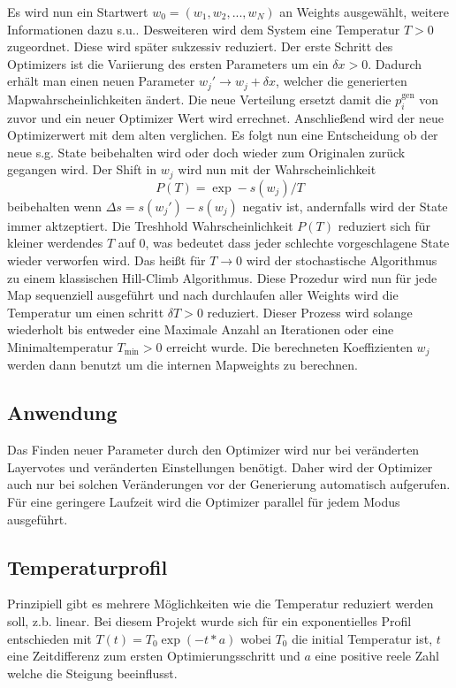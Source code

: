 Es wird nun ein Startwert $w_0=(w_1,w_2,...,w_N)$ an Weights ausgewählt, weitere Informationen dazu s.u.. 
Desweiteren wird dem System eine \glqq Temperatur \grqq $T>0$ zugeordnet. 
Diese wird später sukzessiv reduziert.
Der erste Schritt des Optimizers ist die Variierung des ersten Parameters um ein $\delta x>0$.
Dadurch erhält man einen neuen Parameter $w_j' \rightarrow w_j + \delta x$, welcher die generierten Mapwahrscheinlichkeiten ändert.
Die neue Verteilung ersetzt damit die $p_i^\text{gen}$ von zuvor und ein neuer Optimizer Wert wird errechnet.
Anschließend wird der neue Optimizerwert mit dem alten verglichen.
Es folgt nun eine Entscheidung ob der neue s.g. State beibehalten wird oder doch wieder zum Originalen zurück gegangen wird.
Der Shift in $w_j$ wird nun mit der Wahrscheinlichkeit 
\begin{equation}
    P(T) = \exp -s(w_j)/T 
\end{equation}
beibehalten wenn $\Delta s = s(w_j')-s(w_j)$ negativ ist, andernfalls wird der State immer aktzeptiert. 
Die Treshhold Wahrscheinlichkeit $P(T)$ reduziert sich für kleiner werdendes $T$ auf 0, was bedeutet dass jeder \glqq schlechte \grqq vorgeschlagene State wieder verworfen wird. 
Das heißt für $T\rightarrow 0$ wird der stochastische Algorithmus zu einem klassischen Hill-Climb Algorithmus.
Diese Prozedur wird nun für jede Map sequenziell ausgeführt und nach durchlaufen aller Weights wird die Temperatur um einen schritt $\delta T>0$ reduziert. 
Dieser Prozess wird solange wiederholt bis entweder eine Maximale Anzahl an Iterationen oder eine Minimaltemperatur $T_\text{min}>0$ erreicht wurde.
Die berechneten Koeffizienten $w_j$ werden dann benutzt um die internen Mapweights zu berechnen.
\subsection{Anwendung}
Das Finden neuer Parameter durch den Optimizer wird nur bei veränderten Layervotes und veränderten Einstellungen benötigt.
Daher wird der Optimizer auch nur bei solchen Veränderungen vor der Generierung automatisch aufgerufen.
Für eine geringere Laufzeit wird die Optimizer parallel für jedem Modus ausgeführt.
\subsection{Temperaturprofil}
Prinzipiell gibt es mehrere Möglichkeiten wie die Temperatur reduziert werden soll, z.b. linear. 
Bei diesem Projekt wurde sich für ein exponentielles Profil entschieden mit $T(t) = T_0 \exp\left(-t*a\right)$ wobei $T_0$ die initial Temperatur ist, $t$ eine Zeitdifferenz zum ersten Optimierungsschritt und $a$ eine positive reele Zahl welche die Steigung beeinflusst. 
